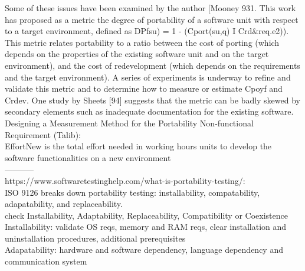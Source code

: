 \documentclass{article}
\begin{document}
 Some of these issues have been examined by the author
 [Mooney 931. This work has proposed as a metric the degree of
 portability
 of a software unit with respect to a target
 environment, defined as
 DPfsu) = 1 - (Cport(su,q) I Crd$\&$req.e2)).\\
 This metric relates portability to a ratio between the cost
 of porting (which depends on the properties of the existing
 software unit and on the target environment), and the cost of
 redevelopment (which depends on the requirements and the
 target environment). A series of experiments is underway to
 refine and validate this metric and to determine how to measure
 or estimate Cpoyf and Crdev.
 One study by Sheets [94]
 suggests that the metric can be badly skewed by secondary
 elements such as inadequate documentation for the existing
 software.\\
   

Designing a Measurement Method for the Portability Non-functional Requirement (Talib):\\
 EffortNew is the total effort needed in working hours units
 to develop the software functionalities on a new
 environment\\
 
 
-----------\\
https://www.softwaretestinghelp.com/what-is-portability-testing/:\\

ISO 9126 breaks down portability testing: installability, compatability, adapatability, and replaceability.\\ 

check Installability, Adaptability, Replaceability, Compatibility or Coexistence\\

Installability: validate OS reqs, memory and RAM reqs, clear installation and uninstallation procedures, additional prerequisites\\

Adapatability: hardware and software dependency, language dependency and communication system\\
\end{document}
